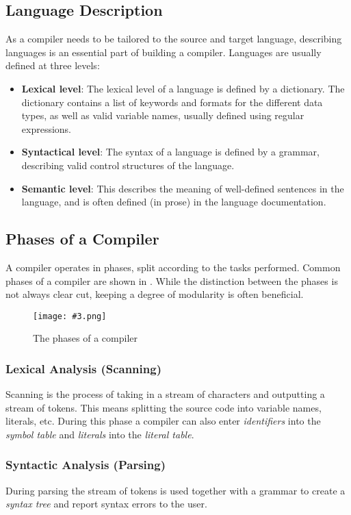 \documentclass{article}
\newcommand{\fig}[4]{
	\begin{figure}[#1]
		\center
		\texttt{[image: \#3.png]}
		\caption{#4}
		\label{fig:#3}
	\end{figure}
	}
\begin{document}
\subsection{Language Description}
As a compiler needs to be tailored to the source and target language, describing languages is an essential part of building a compiler.
Languages are usually defined at three levels:
\begin{itemize}
	\item \textbf{Lexical level}:
		The lexical level of a language is defined by a dictionary.
		The dictionary contains a list of keywords and formats for the different data types, as well as valid variable names, usually defined using regular expressions.
	\item \textbf{Syntactical level}:
		The syntax of a language is defined by a grammar, describing valid control structures of the language.
	\item \textbf{Semantic level}:
		This describes the meaning of well-defined sentences in the language, and is often defined (in prose) in the language documentation.
\end{itemize}

\subsection{Phases of a Compiler}
A compiler operates in phases, split according to the tasks performed.
Common phases of a compiler are shown in .
While the distinction between the phases is not always clear cut, keeping a degree of modularity is often beneficial.

\fig{h}{}{phases}{The phases of a compiler}

\subsubsection{Lexical Analysis (Scanning)}
Scanning is the process of taking in a stream of characters and outputting a stream of tokens.
This means splitting the source code into variable names, literals, etc.
During this phase a compiler can also enter \emph{identifiers} into the \emph{symbol table} and \emph{literals} into the \emph{literal table}.

\subsubsection{Syntactic Analysis (Parsing)}
During parsing the stream of tokens is used together with a grammar to create a \emph{syntax tree} and report syntax errors to the user.
\end{document}
